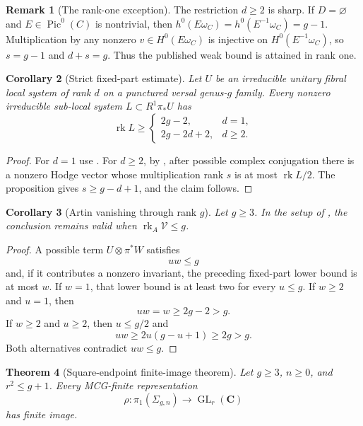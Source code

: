 \documentclass[11pt]{article}
\newtheorem{theorem}{Theorem}[section]
\newtheorem{corollary}[theorem]{Corollary}
\theoremstyle{definition}
\newtheorem{remark}[theorem]{Remark}
\newcommand{\C}{\mathbf C}
\newcommand{\Vcal}{\mathcal V}
\newcommand{\rk}{\operatorname{rk}}
\newcommand{\Pic}{\operatorname{Pic}}
\newcommand{\GL}{\operatorname{GL}}
\begin{document}
\begin{remark}[The rank-one exception]
The restriction $d\ge2$ is sharp.  If $D=\varnothing$ and
$E\in\Pic^0(C)$ is nontrivial, then
$h^0(E\omega_C)=h^0(E^{-1}\omega_C)=g-1$.  Multiplication by any nonzero
$v\in H^0(E\omega_C)$ is injective on $H^0(E^{-1}\omega_C)$, so
$s=g-1$ and $d+s=g$.  Thus the published weak bound is attained in rank
one.
\end{remark}

\begin{corollary}[Strict fixed-part estimate]\label{cor:endpoint}
Let $U$ be an irreducible unitary fibral local system of rank $d$ on a
punctured versal genus-$g$ family.  Every nonzero irreducible sub-local
system $L\subset R^1\pi_*U$ has
\[
 \rk L\ge
 \begin{cases}
 2g-2,&d=1,\\
 2g-2d+2,&d\ge2.
 \end{cases}
\]
\end{corollary}

\begin{proof}
For $d=1$ use \cite[Theorem 1.7.1]{LLCan}.  For $d\ge2$, by
\cite[Lemma 6.1.1]{LLCan}, after possible complex conjugation there is a
nonzero Hodge vector whose multiplication rank $s$ is at most $\rk L/2$.
The proposition gives $s\ge g-d+1$, and the claim follows.
\end{proof}

\begin{corollary}[Artin vanishing through rank $g$]\label{cor:artin-endpoint}
Let $g\ge3$.  In the setup of \cite[Theorem 6.2.1]{LLCan}, the conclusion
remains valid when $\rk_A\Vcal\le g$.
\end{corollary}

\begin{proof}
A possible term $U\otimes\pi^*W$ satisfies
\[
 uw\le g
\]
and, if it contributes a nonzero invariant, the preceding fixed-part lower
bound is at most $w$.  If $w=1$, that lower bound is at least two for every
$u\le g$.  If $w\ge2$ and $u=1$, then
\[
 uw=w\ge2g-2>g.
\]
If $w\ge2$ and $u\ge2$, then $u\le g/2$ and
\[
 uw\ge2u(g-u+1)\ge2g>g.
\]
Both alternatives contradict $uw\le g$.
\end{proof}


\begin{theorem}[Square-endpoint finite-image theorem]\label{thm:square-endpoint}
Let $g\ge3$, $n\ge0$, and $r^2\le g+1$.  Every MCG-finite representation
\[
 \rho:\pi_1(\Sigma_{g,n})\longrightarrow\GL_r(\C)
\]
has finite image.
\end{theorem}
\end{document}
